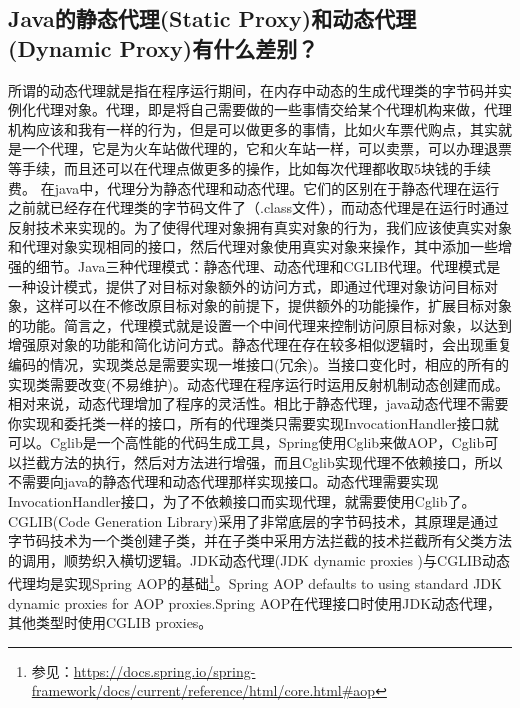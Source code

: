 \documentclass[../../../interview-questions.tex]{subfiles}
\begin{document}
\subsection{Java的静态代理(Static Proxy)和动态代理(Dynamic Proxy)有什么差别？}

所谓的动态代理就是指在程序运行期间，在内存中动态的生成代理类的字节码并实例化代理对象。代理，即是将自己需要做的一些事情交给某个代理机构来做，代理机构应该和我有一样的行为，但是可以做更多的事情，比如火车票代购点，其实就是一个代理，它是为火车站做代理的，它和火车站一样，可以卖票，可以办理退票等手续，而且还可以在代理点做更多的操作，比如每次代理都收取5块钱的手续费。
在java中，代理分为静态代理和动态代理。它们的区别在于静态代理在运行之前就已经存在代理类的字节码文件了（.class文件），而动态代理是在运行时通过反射技术来实现的。为了使得代理对象拥有真实对象的行为，我们应该使真实对象和代理对象实现相同的接口，然后代理对象使用真实对象来操作，其中添加一些增强的细节。Java三种代理模式：静态代理、动态代理和CGLIB代理。代理模式是一种设计模式，提供了对目标对象额外的访问方式，即通过代理对象访问目标对象，这样可以在不修改原目标对象的前提下，提供额外的功能操作，扩展目标对象的功能。简言之，代理模式就是设置一个中间代理来控制访问原目标对象，以达到增强原对象的功能和简化访问方式。静态代理在存在较多相似逻辑时，会出现重复编码的情况，实现类总是需要实现一堆接口(冗余)。当接口变化时，相应的所有的实现类需要改变(不易维护)。动态代理在程序运行时运用反射机制动态创建而成。相对来说，动态代理增加了程序的灵活性。相比于静态代理，java动态代理不需要你实现和委托类一样的接口，所有的代理类只需要实现InvocationHandler接口就可以。Cglib是一个高性能的代码生成工具，Spring使用Cglib来做AOP，Cglib可以拦截方法的执行，然后对方法进行增强，而且Cglib实现代理不依赖接口，所以不需要向java的静态代理和动态代理那样实现接口。动态代理需要实现InvocationHandler接口，为了不依赖接口而实现代理，就需要使用Cglib了。CGLIB(Code Generation Library)采用了非常底层的字节码技术，其原理是通过字节码技术为一个类创建子类，并在子类中采用方法拦截的技术拦截所有父类方法的调用，顺势织入横切逻辑。JDK动态代理(JDK dynamic proxies )与CGLIB动态代理均是实现Spring AOP的基础\footnote{参见：\url{https://docs.spring.io/spring-framework/docs/current/reference/html/core.html\#aop}}。Spring AOP defaults to using standard JDK dynamic proxies for AOP proxies.Spring AOP在代理接口时使用JDK动态代理，其他类型时使用CGLIB proxies。
\end{document}
